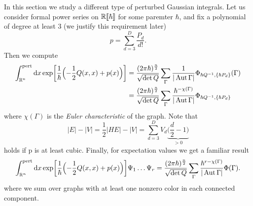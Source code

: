 In this section we study a different type of perturbed Gaussian integrals.
Let us consider formal power series on $\mathbb{R} \llbracket \hbar \rrbracket$ for some paremter $\hbar$, and fix a polynomial of degree at least $3$ (we justify this requirement later)
\begin{equation*}
    p = \sum_{d = 3}^D \frac{P_d}{d!}.
\end{equation*}
Then we compute
\begin{align*}
  \int_{\mathbb{R}^n}^\text{pert} \mathrm{d} x
  \exp \biggl[ \frac{1}{\hbar} \Bigl( -\frac{1}{2} Q(x, x) + p(x) \Bigr) \biggr]
  &= \frac{(2 \pi \hbar)^{\frac{n}{2}}}{\sqrt{\det Q}}
  \sum_{\Gamma} \frac{1}{|\operatorname{Aut} \Gamma|}
  \Phi_{\hbar Q^{-1}, \{ \hbar P_d \}} (\Gamma) \\
  &= \frac{(2 \pi \hbar)^{\frac{n}{2}}}{\sqrt{\det Q}}
  \sum_{\Gamma} \frac{\hbar^{- \chi (\Gamma)}}{|\operatorname{Aut} \Gamma|}
  \Phi_{\hbar Q^{-1}, \{ \hbar P_d \}}
\end{align*}
where $\chi(\Gamma)$ is the \textit{Euler characteristic} of the graph. Note that
\begin{equation*}
  |E| - |V| = \frac{1}{2} |HE| - |V| = \sum_{d = 3}^D V_d
  \underbrace{\biggl( \frac{d}{2} - 1 \biggr)}_{> 0}
\end{equation*}
holds if p is at least cubic. Finally, for expectation values we get a familiar result
\begin{equation*}
  \int_{\mathbb{R}^n}^\text{pert} \mathrm{d} x
  \exp \biggl[ \frac{1}{\hbar} \Bigl( -\frac{1}{2} Q(x, x) + p(x) \Bigr) \biggr]
  \Psi_1 \dots \Psi_r
  = \frac{(2 \pi \hbar)^{\frac{n}{2}}}{\sqrt{\det Q}}
  \sum_{\Gamma} \frac{\hbar^{r - \chi(\Gamma)}}{|\operatorname{Aut} \Gamma|}
  \Phi (\Gamma).
  \end{equation*}
  where we sum over graphs with at least one nonzero color in each connected component.
